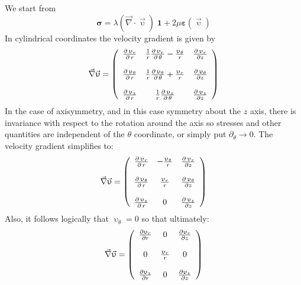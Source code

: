 We start from 
\begin{equation}
{\bm \sigma} = 
\lambda (\vec\nabla\cdot\vec{\upupsilon}) \;  {\bm 1}
+2 \mu {\bm \varepsilon}(\vec{\upupsilon})
\label{eq:elast_as}
\end{equation}
In cylindrical coordinates the velocity gradient is given by 
\[
\vec\nabla \vec{\upupsilon}  =
\left(
\begin{array}{ccc}
{\partial \, \upupsilon_r \over \partial \, r} &
{1 \over r} {\partial \, \upupsilon_r \over \partial \, \theta} - {\upupsilon_{\theta} \over r} &
{\partial \, \upupsilon_r \over \partial z} \\
\\
{\partial \, \upupsilon_{\theta} \over \partial \, r} &
{1 \over r} {\partial \, \upupsilon_{\theta} \over \partial \, \theta} + {\upupsilon_r \over r} &
{\partial \, \upupsilon_{\theta} \over \partial z} \\
\\
{\partial \, \upupsilon_{z} \over \partial \, r} &
{1 \over r} {\partial \, \upupsilon_{z} \over \partial \, \theta} &
{\partial \, \upupsilon_{z} \over \partial z}
\end{array}
\right)
\]
In the case of axisymmetry, and in this case symmetry about the $z$ axis, there is invariance with respect to the rotation around the axis so stresses and other quantities are independent of the $\theta$ coordinate, or simply put $\partial_\theta \rightarrow 0$.
The velocity gradient simplifies to:
\[
\vec\nabla \vec{\upupsilon}  =
\left(
\begin{array}{ccc}
{\partial \, \upupsilon_r \over \partial \, r} &
- {\upupsilon_{\theta} \over r} &
{\partial \, \upupsilon_r \over \partial z} \\
\\
{\partial \, \upupsilon_{\theta} \over \partial \, r} &
{\upupsilon_r \over r} &
{\partial \, \upupsilon_{\theta} \over \partial z} \\
\\
{\partial \, \upupsilon_{z} \over \partial \, r} &
0 &
{\partial \, \upupsilon_{z} \over \partial z}
\end{array}
\right)
\]
Also, it follows logically that $\upupsilon_\theta=0$ so that ultimately:
\[
\vec\nabla \vec{\upupsilon}  =
\left(
\begin{array}{ccc}
\frac{\partial \upupsilon_r}{\partial r} & 0 & 
{\partial  \upupsilon_r \over \partial z} \\\\
0 & {\upupsilon_r \over r} & 0 \\ \\
{\partial \upupsilon_{z} \over \partial  r} & 0 & 
{\partial  \upupsilon_{z} \over \partial z}
\end{array}
\right)
\]
